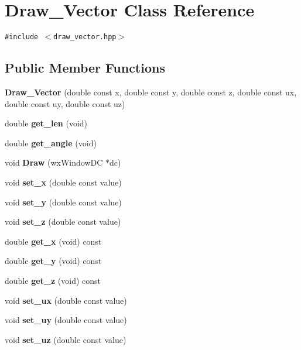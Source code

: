 \section{Draw\_\-Vector Class Reference}
\label{classDraw__Vector}
{\tt \#include $<$draw\_\-vector.hpp$>$}

\subsection*{Public Member Functions}
\begin{CompactItemize}
\item 
{\bf Draw\_\-Vector} (double const x, double const y, double const z, double const ux, double const uy, double const uz)\label{classDraw__Vector_a0}

\item 
double {\bf get\_\-len} (void)\label{classDraw__Vector_a1}

\item 
double {\bf get\_\-angle} (void)\label{classDraw__Vector_a2}

\item 
void {\bf Draw} (wx\-Window\-DC $\ast$dc)\label{classDraw__Vector_a3}

\item 
void {\bf set\_\-x} (double const value)\label{classDraw__Vector_a4}

\item 
void {\bf set\_\-y} (double const value)\label{classDraw__Vector_a5}

\item 
void {\bf set\_\-z} (double const value)\label{classDraw__Vector_a6}

\item 
double {\bf get\_\-x} (void) const \label{classDraw__Vector_a7}

\item 
double {\bf get\_\-y} (void) const \label{classDraw__Vector_a8}

\item 
double {\bf get\_\-z} (void) const \label{classDraw__Vector_a9}

\item 
void {\bf set\_\-ux} (double const value)\label{classDraw__Vector_a10}

\item 
void {\bf set\_\-uy} (double const value)\label{classDraw__Vector_a11}

\item 
void {\bf set\_\-uz} (double const value)\label{classDraw__Vector_a12}


\end{CompactItemize}
